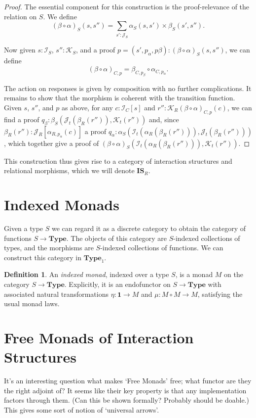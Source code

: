 \documentclass{article}
\theoremstyle{definition}
\newtheorem{definition}[theorem]{Definition}
\newcommand{\iss}[1]{\mathcal{#1}_S}
\newcommand{\isc}[1]{\mathcal{#1}_C}
\newcommand{\isr}[1]{\mathcal{#1}_R}
\newcommand{\ist}[1]{\mathcal{#1}_t}
\begin{document}
    \begin{proof}
        The essential component for this construction is the proof-relevance of the relation on $S$.  We define
        \[
            (\beta \circ \alpha)_S(s, s'') = \sum_{s' : \iss J} \alpha_S(s, s') \times \beta_S(s', s'').
        \]

        Now given $s : \iss I$, $s'' : \iss K$, and a proof $p = (s', p_\alpha, p\beta) : (\beta \circ \alpha)_S(s, s'')$,
        we can define
        \[
            (\beta \circ \alpha)_{C, p} = \beta_{C, p_\beta} \circ \alpha_{C, p_\alpha}.
        \]

        The action on responses is given by composition with no further complications.  It remains to show that the
        morphism is coherent with the transition function.  Given $s$, $s''$, and $p$ as above, for any $c : \isc I[s]$
        and $r'' : \isr K{(\beta \circ \alpha)_{C, p}(c)}$, we can find a proof $q_\beta : \beta_S(\ist J(\beta_R(r'')),
        \ist K(r''))$ and, since $\beta_R(r'') : \isr J[\alpha_{R, p_\alpha}(c)]$ a proof $q_\alpha :
        \alpha_S(\ist I(\alpha_R(\beta_R(r''))), \ist J(\beta_R(r'')))$, which together give a proof of $(\beta \circ
        \alpha)_S(\ist I(\alpha_R(\beta_R(r''))), \ist K(r''))$.
    \end{proof}

    This construction thus gives rise to a category of interaction structures and relational morphisms, which we will
    denote $\mathbf{IS}_R$.

    \section{Indexed Monads}

    Given a type $S$ we can regard it as a discrete category to obtain the category of functions $S \to \mathbf{Type}$.
    The objects of this category are $S$-indexed collections of types, and the morphisms are $S$-indexed collections of
    functions.  We can construct this category in $\mathbf{Type}_1$.

    \begin{definition}
        An \emph{indexed monad}, indexed over a type $S$, is a monad $M$ on the category $S \to \mathbf{Type}$.
        Explicitly, it is an endofunctor on $S \to \mathbf{Type}$ with associated natural transformations $\eta :
        \mathbf{1} \to M$ and $\mu : M \circ M \to M$, satisfying the usual monad laws.
    \end{definition}

    \section{Free Monads of Interaction Structures}

    It's an interesting question what makes `Free Monads' free; what functor are they the right adjoint of?
    It seems like their key property is that any implementation factors through them.  (Can this be shown formally?
    Probably should be doable.)  This gives some sort of notion of `universal arrows'.

\end{document}
